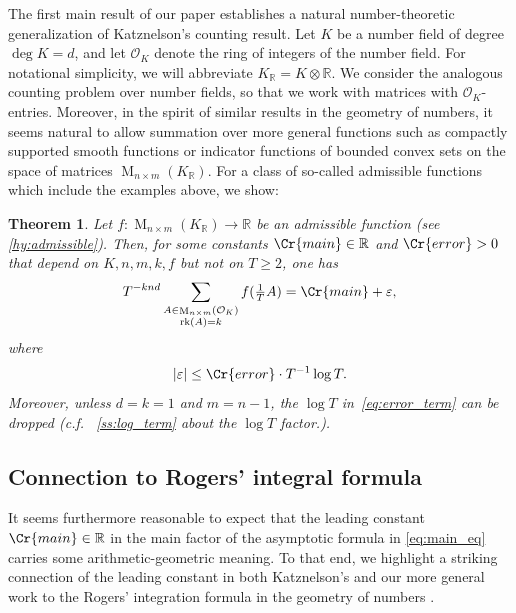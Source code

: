 \documentclass{amsart}
\newtheorem{theorem}{Theorem}
\theoremstyle{definition}
\theoremstyle{remark}
\newcommand{\OK}{\mathcal{O}_K}
\newcommand{\KR}{K_\mathbb{R}}
\DeclareMathOperator{\M}{M}
\DeclareMathOperator{\rank}{rk}
\begin{document}
The first main result of our paper establishes a natural number-theoretic generalization of Katznelson's counting result. 
Let $K$ be a number field of degree $\deg K = d$,
and let $\OK$ denote the ring of integers of the number field. 
For notational simplicity, we will abbreviate $\KR = K \otimes \mathbb{R}$. 
We consider the analogous counting problem over number fields, so that we work with matrices with $\OK$-entries. Moreover, in the spirit of similar results in the geometry of numbers, it seems natural to allow summation over more general functions such as compactly supported smooth functions or indicator functions of bounded convex sets on the space of matrices $\M_{n \times m}(\KR)$. For a class of so-called admissible functions which include the examples above, we show: 
\begin{theorem}
    Let $f: \M_{n \times m}( \KR) \rightarrow  \mathbb{R}$ be an admissible function (see \cref{hy:admissible}). 
    Then, for some constants $\Cr{main} \in \mathbb{R}$ and $\Cr{error}>0$ that depend on $K,n,m,k,f$ but not on $T \geq 2$, one has 
    \begin{equation}
        T^{-knd}\sum_{\substack{A \in \M_{ n \times m }(\OK) \\ \rank(A) = k }} f( \tfrac{1}{T} A)  =  \Cr{main} + \varepsilon,
        \label{eq:main_eq}
    \end{equation}
    where 
    \begin{equation}
        |\varepsilon| \leq \Cr{error} \cdot T^{-1} \log T.
        \label{eq:error_term}
    \end{equation}
    \label{th:main}
    Moreover, unless $d=k=1$ and $m=n-1$, the $\log T$ in~\cref{eq:error_term} can be dropped (c.f. ~\cref{ss:log_term} about the $\log T$ factor.).
\end{theorem}


\subsection{Connection to Rogers' integral formula}
It seems furthermore reasonable to expect that the leading constant $\Cr{main} \in \mathbb{R}$ in the main factor of the asymptotic formula in \cref{eq:main_eq} carries some arithmetic-geometric meaning. To that end, we highlight a striking connection of the leading constant in both Katznelson's and our more general work to the Rogers' integration formula in the geometry of numbers \cite{GSV23,Rogers55, Rogers58}
. 
\end{document}
